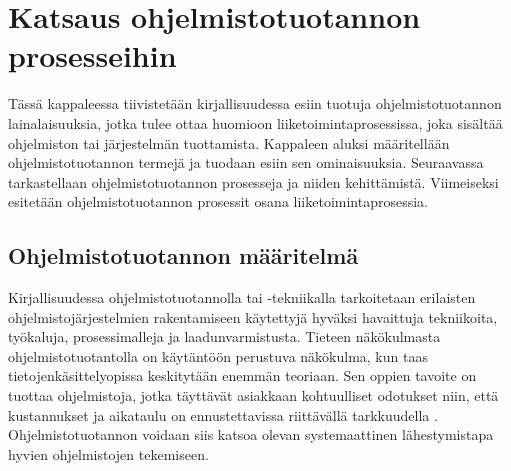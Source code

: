 \documentclass[finnish,12pt,a4paper,pdftex]{article}
\begin{document}

\clearpage

\section{Katsaus ohjelmistotuotannon prosesseihin}

Tässä kappaleessa tiivistetään kirjallisuudessa esiin tuotuja ohjelmistotuotannon lainalaisuuksia, jotka tulee ottaa huomioon liiketoimintaprosessissa, joka sisältää ohjelmiston tai järjestelmän tuottamista. Kappaleen aluksi määritellään ohjelmistotuotannon termejä ja tuodaan esiin sen ominaisuuksia. Seuraavassa tarkastellaan ohjelmistotuotannon prosesseja ja niiden kehittämistä. Viimeiseksi esitetään ohjelmistotuotannon prosessit osana liiketoimintaprosessia.

\subsection{Ohjelmistotuotannon määritelmä}

Kirjallisuudessa ohjelmistotuotannolla tai -tekniikalla tarkoitetaan erilaisten ohjelmistojärjestelmien rakentamiseen käytettyjä hyväksi havaittuja tekniikoita, työkaluja, prosessimalleja ja laadunvarmistusta. Tieteen näkökulmasta ohjelmistotuotantolla on käytäntöön perustuva näkökulma, kun taas tietojenkäsittelyopissa keskitytään enemmän teoriaan. Sen oppien tavoite on tuottaa ohjelmistoja, jotka täyttävät asiakkaan kohtuulliset odotukset niin, että kustannukset ja aikataulu on ennustettavissa riittävällä tarkkuudella \citep{okaytannot}. Ohjelmistotuotannon voidaan siis katsoa olevan systemaattinen lähestymistapa hyvien ohjelmistojen tekemiseen.\\
\end{document}

